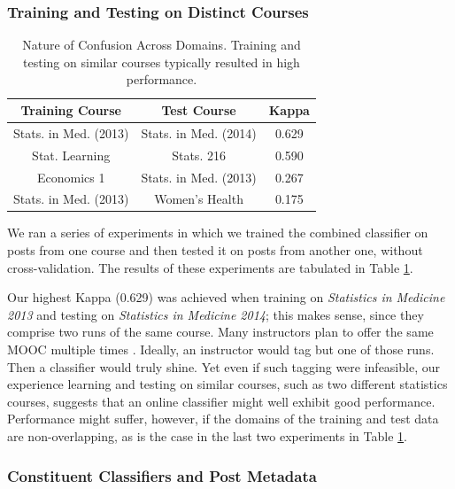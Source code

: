 \documentclass{edm_template}
\begin{document}
\subsubsection{Training and Testing on Distinct Courses}

\begin{table}[h!]
       \centering
       \begin{tabular}{|c|c|c|}
       \hline
       Training Course                & Test Course                    & Kappa \\ \hline
       Stats. in Med. (2013)  & Stats. in Med. (2014)  & 0.629 \\ \hline
       Stat. Learning           & Stats. 216                 & 0.590 \\ \hline
       Economics 1                    & Stats. in Med. (2013)  & 0.267 \\ \hline
       Stats. in Med. (2013)  & Women's Health                 & 0.175 \\ \hline
       \end{tabular}
       \vspace{-5pt}
       \caption{\textnormal{
       Nature of Confusion Across Domains. Training and testing on similar courses typically resulted in high performance.
       }} 
       \label{table:across_courses} %
\end{table}

We ran a series of experiments in which we trained the combined classifier on posts from one course and then tested it on posts from another one, without cross-validation. The results of these experiments are tabulated in Table \ref{table:across_courses}. 

Our highest Kappa (0.629) was achieved when training on \emph{Statistics in Medicine 2013} and testing on \emph{Statistics in Medicine 2014}; this makes sense, since they comprise two runs of the same course. Many instructors plan to offer the same MOOC multiple times \cite{hollands2014moocs}. Ideally, an instructor would tag but one of those runs. Then a classifier would truly shine. Yet even if such tagging were infeasible, our experience learning and testing on similar courses, such as two different statistics courses, suggests that an online classifier might well exhibit good performance. Performance might suffer, however, if the domains of the training and test data are non-overlapping, as is the case in the last two experiments in Table \ref{table:across_courses}.

\subsubsection{Constituent Classifiers and Post Metadata}
\end{document}
